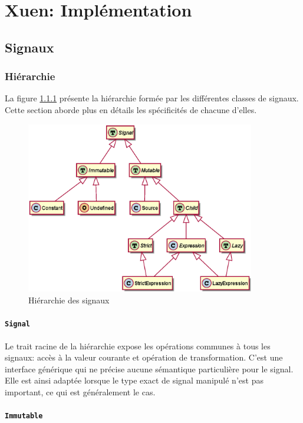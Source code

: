 \chapter{Xuen: Implémentation}

\section{Signaux}

\subsection{Hiérarchie}
\label{sec:sig-hierarchy}

La figure \ref{sec:sig-hierarchy} présente la hiérarchie formée par les différentes classes de signaux. Cette section aborde plus en détails les spécificités de chacune d'elles.

\begin{figure}[h]
	\centering
	\includegraphics[width=10cm]{img/sig_hierarchy.eps}
	\caption{Hiérarchie des signaux}
	\label{fig:sig-hierarchy}
\end{figure}

\subsubsection{\texttt{Signal}}

Le trait racine de la hiérarchie expose les opérations communes à tous les signaux: accès à la valeur courante et opération de transformation. C'est une interface générique qui ne précise aucune sémantique particulière pour le signal. Elle est ainsi adaptée lorsque le type exact de signal manipulé n'est pas important, ce qui est généralement le cas.

\subsubsection{\texttt{Immutable}}

